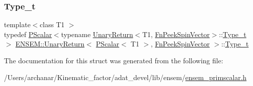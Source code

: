 \subsubsection{\texorpdfstring{Type\_t}{Type\_t}\hspace{0.1cm}{\footnotesize\ttfamily [2/2]}}
{\footnotesize\ttfamily template$<$class T1 $>$ \\
typedef \mbox{\hyperlink{classENSEM_1_1PScalar}{P\+Scalar}}$<$typename \mbox{\hyperlink{structENSEM_1_1UnaryReturn}{Unary\+Return}}$<$T1, \mbox{\hyperlink{structENSEM_1_1FnPeekSpinVector}{Fn\+Peek\+Spin\+Vector}}$>$\+::\mbox{\hyperlink{structENSEM_1_1UnaryReturn_3_01PScalar_3_01T1_01_4_00_01FnPeekSpinVector_01_4_ac623af45f4638d6db8fefb084c447ef0}{Type\+\_\+t}}$>$ \mbox{\hyperlink{structENSEM_1_1UnaryReturn}{E\+N\+S\+E\+M\+::\+Unary\+Return}}$<$ \mbox{\hyperlink{classENSEM_1_1PScalar}{P\+Scalar}}$<$ T1 $>$, \mbox{\hyperlink{structENSEM_1_1FnPeekSpinVector}{Fn\+Peek\+Spin\+Vector}} $>$\+::\mbox{\hyperlink{structENSEM_1_1UnaryReturn_3_01PScalar_3_01T1_01_4_00_01FnPeekSpinVector_01_4_ac623af45f4638d6db8fefb084c447ef0}{Type\+\_\+t}}}



The documentation for this struct was generated from the following file\+:\begin{DoxyCompactItemize}
\item 
/\+Users/archanar/\+Kinematic\+\_\+factor/adat\+\_\+devel/lib/ensem/\mbox{\hyperlink{lib_2ensem_2ensem__primscalar_8h}{ensem\+\_\+primscalar.\+h}}\end{DoxyCompactItemize}
